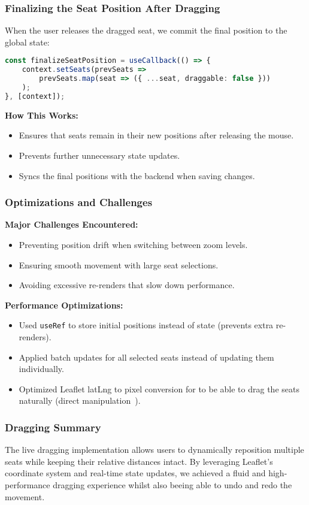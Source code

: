 \subsubsection{Finalizing the Seat Position After Dragging}
When the user releases the dragged seat, we commit the final position to the global state:

\begin{lstlisting}[language=TypeScript, caption=Finalizing Seat Position After Dragging, label=lst:seat-drop-final]
const finalizeSeatPosition = useCallback(() => {
    context.setSeats(prevSeats =>
        prevSeats.map(seat => ({ ...seat, draggable: false }))
    );
}, [context]);
\end{lstlisting}

\textbf{How This Works:}
\begin{itemize}
    \item Ensures that seats remain in their new positions after releasing the mouse.
    \item Prevents further unnecessary state updates.
    \item Syncs the final positions with the backend when saving changes.
\end{itemize}

\subsubsection{Optimizations and Challenges}
\textbf{Major Challenges Encountered:}
\begin{itemize}
    \item Preventing position drift when switching between zoom levels.
    \item Ensuring smooth movement with large seat selections.
    \item Avoiding excessive re-renders that slow down performance.
\end{itemize}

\textbf{Performance Optimizations:}
\begin{itemize}
    \item Used \texttt{useRef} to store initial positions instead of state (prevents extra re-renders).
    \item Applied batch updates for all selected seats instead of updating them individually.
    \item Optimized Leaflet latLng to pixel conversion for to be able to drag the seats naturally (direct manipulation~\cite{Hutchins01121985}).
\end{itemize}

\subsubsection{Dragging Summary}
The live dragging implementation allows users to dynamically reposition multiple seats while keeping their relative distances intact. By leveraging Leaflet’s coordinate system and real-time state updates, we achieved a fluid and high-performance dragging experience whilst also beeing able to undo and redo the movement.
